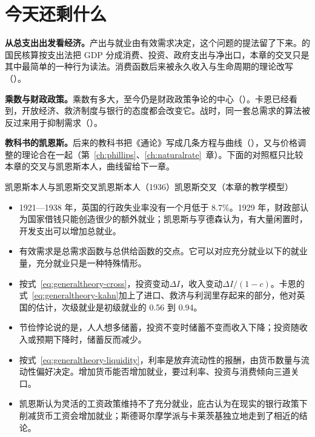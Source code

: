 \section{今天还剩什么}\label{sec:generaltheory-legacy}

\textbf{从总支出出发看经济。}产出与就业由有效需求决定，这个问题的提法留了下来。的国民核算按支出法把 GDP 分成消费、投资、政府支出与净出口，本章的交叉只是其中最简单的一种行为读法。消费函数后来被永久收入与生命周期的理论改写（）。

\textbf{乘数与财政政策。}乘数有多大，至今仍是财政政策争论的中心（）。卡恩已经看到，开放经济、救济制度与银行的态度都会改变它。战时，同一套总需求的算法被反过来用于抑制需求（）。

\textbf{教科书的凯恩斯。}后来的教科书把《通论》写成几条方程与曲线（），又与价格调整的理论合在一起（第~\ref{ch:phillips}、\ref{ch:naturalrate}~章）。下面的对照框只比较本章的交叉与凯恩斯本人，曲线留给下一章。

\begin{compare}{凯恩斯本人与凯恩斯交叉}{凯恩斯本人（1936）}{凯恩斯交叉（本章的教学模型）}
\end{compare}

\begin{takeaways}
\begin{itemize}
\item 1921—1938 年，英国的行政失业率没有一个月低于 8.7\%。1929 年，财政部认为国家借钱只能创造很少的额外就业；凯恩斯与亨德森认为，有大量闲置时，开发支出可以增加总就业。
\item 有效需求是总需求函数与总供给函数的交点。它可以对应充分就业以下的就业量，充分就业只是一种特殊情形。
\item 按式~\eqref{eq:generaltheory-cross}，投资变动$\Delta I$，收入变动$\Delta I/(1-c)$。卡恩的式~\eqref{eq:generaltheory-kahn}加上了进口、救济与利润里存起来的部分，他对英国的估计，次级就业是初级就业的 0.56 到 0.94。
\item 节俭悖论说的是，人人想多储蓄，投资不变时储蓄不变而收入下降；投资随收入或预期下降时，储蓄反而减少。
\item 按式~\eqref{eq:generaltheory-liquidity}，利率是放弃流动性的报酬，由货币数量与流动性偏好决定。增加货币能否增加就业，要过利率、投资与消费倾向三道关口。
\item 凯恩斯认为灵活的工资政策维持不了充分就业，庇古认为在现实的银行政策下削减货币工资会增加就业；斯德哥尔摩学派与卡莱茨基独立地走到了相近的结论。
\end{itemize}
\end{takeaways}

